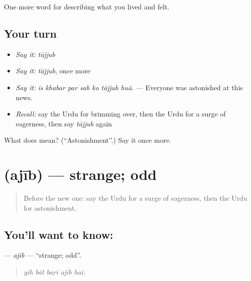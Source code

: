\begin{grammarlens}[title={What you've built}]
One more word for describing what you lived and felt.
\end{grammarlens}

\subsection*{Your turn}
\begin{itemize}
\raggedright
  \item \emph{Say it:} \emph{tājjub}
  \item \emph{Say it:} \emph{tājjub}, once more
  \item \emph{Say it:} \emph{is khabar par sab ko tājjub huā.} — Everyone was astonished at this news.
  \item \emph{Recall:} say the Urdu for brimming over, then the Urdu for a surge of eagerness, then say \emph{tājjub} again
\end{itemize}

\begin{tcolorbox}[breakable,colback=teal!4,colframe=teal!35!black,title={Before you move on}]
What does  mean? (\textquotedblleft{}Astonishment\textquotedblright{}.) Say it once more.
\end{tcolorbox}
\section[\texorpdfstring{\ur{عجیب} (ajīb)}{عجیب (ajīb)}]{ (ajīb) — strange; odd}

\label{lesson:UR-C442-ajib}



\begin{quote}
Before the new one: say the Urdu for a surge of eagerness, then the Urdu for astonishment.
\end{quote}

\subsection*{You'll want to know: }
\textbf{} — \emph{ajīb} — \textquotedblleft{}strange; odd\textquotedblright{}.

\begin{quote}
    
\end{quote}

\begin{quote}
\emph{yih bāt baṛī ajīb hai.}
\end{quote}

